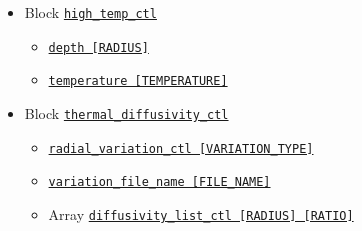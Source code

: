 \begin{itemize}
\begin{itemize}
\begin{itemize}
			\begin{itemize}  \label{href_i:low_temp_ctl}
			\item \hyperref[href_t:l_depth]      {\tt depth        [RADIUS]}
			\item \hyperref[href_t:l_temperature]{\tt temperature  [TEMPERATURE]}
			\end{itemize}
%
		\item Block \hyperref[href_t:high_temp_ctl]{\tt high\_temp\_ctl}
			\begin{itemize}  \label{href_i:high_temp_ctl}
			\item \hyperref[href_t:h_depth]      {\tt depth        [RADIUS]}
			\item \hyperref[href_t:h_temperature]{\tt temperature  [TEMPERATURE]}
			\end{itemize}
%
		\item Block \hyperref[href_t:thermal_diffusivity_ctl]{\tt thermal\_diffusivity\_ctl}
			\begin{itemize}  \label{href_i:thermal_diffusivity_ctl}
			\item \hyperref[href_t:radial_variation_ctl]{\tt radial\_variation\_ctl  [VARIATION\_TYPE]}
			\item \hyperref[href_t:variation_file_name]{\tt variation\_file\_name  [FILE\_NAME]}
			\item Array \hyperref[href_t:diffusivity_list_ctl]{\tt diffusivity\_list\_ctl  [RADIUS]  [RATIO]}


\end{itemize}
\end{itemize}
\end{itemize}
\end{itemize}
